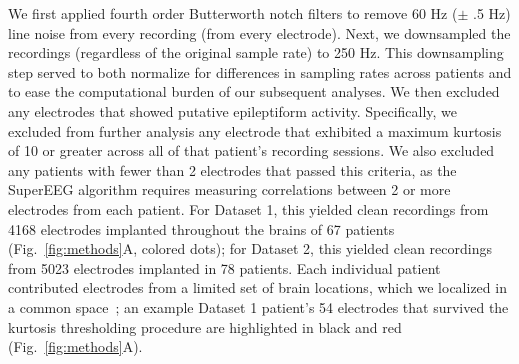 \documentclass[11pt]{article}
\begin{document}
We first applied fourth order Butterworth notch filters to remove 60 Hz ($\pm$
.5 Hz) line noise from every recording (from every electrode). Next, we
downsampled the recordings (regardless of the original sample rate) to 250 Hz.
This downsampling step served to both normalize for differences in sampling
rates across patients and to ease the computational burden of our subsequent
analyses.  We then excluded any electrodes that showed putative epileptiform
activity. Specifically, we excluded from further analysis any electrode that
exhibited a maximum kurtosis of 10 or greater across all of that patient's
recording sessions.  We also excluded any patients with fewer than 2 electrodes
that passed this criteria, as the SuperEEG algorithm requires measuring
correlations between 2 or more electrodes from each patient.  For Dataset 1,
this yielded clean recordings from 4168 electrodes implanted throughout the
brains of 67 patients (Fig.~\ref{fig:methods}A, colored dots); for Dataset 2,
this yielded clean recordings from 5023 electrodes implanted in 78 patients.
Each individual patient contributed electrodes from a limited set of brain
locations, which we localized in a common space~\citep[MNI152;][]{GrabEtal06};
an example Dataset 1 patient's 54 electrodes that survived the kurtosis
thresholding procedure are highlighted in black and red
(Fig.~\ref{fig:methods}A).
\end{document}
